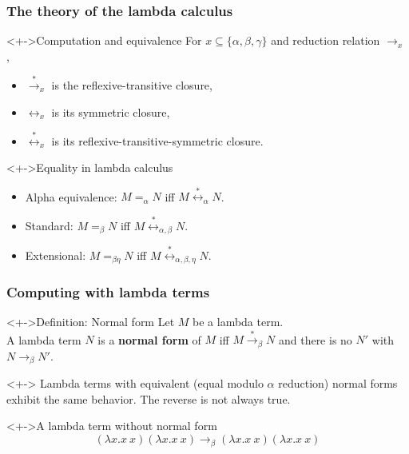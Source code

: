 \documentclass[pdftex,aspectratio=169]{beamer}
\begin{document}
\begin{frame}[fragile]
  \frametitle{The theory of the lambda calculus}
  \begin{alertblock}<+->{Computation and equivalence}
    For $x\subseteq\{\alpha,\beta,\gamma\}$ and reduction relation $\rightarrow_x$,
    \begin{itemize}
    \item $\stackrel{\ast}{\rightarrow}_x$ is the reflexive-transitive
      closure,
    \item $\leftrightarrow_x$ is its symmetric closure,
    \item $\overset{\ast}{\leftrightarrow}_x$ is its
      reflexive-transitive-symmetric closure.
    \end{itemize}
  \end{alertblock}
  \begin{alertblock}<+->{Equality in lambda calculus}
    \begin{itemize}
    \item Alpha equivalence: $M =_\alpha N$ iff $M
      \overset{\ast}{\leftrightarrow}_{\alpha} N$.
    \item Standard: $M =_\beta N$ iff $M
      \overset{\ast}{\leftrightarrow}_{\alpha,\beta} N$.
    \item Extensional: $M =_{\beta\eta} N$ iff $M
      \overset{\ast}{\leftrightarrow}_{\alpha,\beta,\eta} N$.
    \end{itemize}
  \end{alertblock}
\end{frame}             


\begin{frame}[fragile]
  \frametitle{Computing with lambda terms}
  \begin{alertblock}<+->{Definition: Normal form}
    Let $M$ be a lambda term. \\
    A lambda term $N$ is a \textbf{normal
      form} of $M$ iff $M\overset{\ast}{\rightarrow}_\beta N$ and there
    is no $N'$ with $N\rightarrow_\beta N'$.
  \end{alertblock}
  \begin{block}<+->{}
    Lambda terms with equivalent (equal modulo $\alpha$ reduction) normal
    forms exhibit the same behavior.
    The reverse is not always true.
  \end{block}
  \begin{alertblock}<+->{A lambda term without normal form}
    \begin{displaymath}
  (\lambda x.x~x)(\lambda x.x~x) \rightarrow_\beta (\lambda
  x.x~x)(\lambda x.x~x) 
\end{displaymath}
  \end{alertblock}
\end{frame}             
\end{document}
